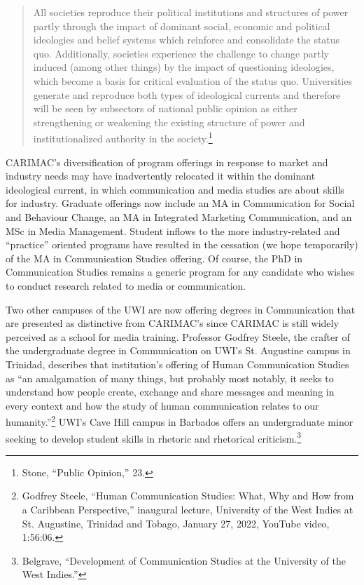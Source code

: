 \documentclass{tufte-handout}
\begin{document}
\begin{quote}
All societies reproduce their political institutions and structures of
power partly through the impact of dominant social, economic and
political ideologies and belief systems which reinforce and consolidate
the status quo. Additionally, societies experience the challenge to
change partly induced (among other things) by the impact of questioning
ideologies, which become a basis for critical evaluation of the status
quo. Universities generate and reproduce both types of ideological
currents and therefore will be seen by subsectors of national public
opinion as either strengthening or weakening the existing structure of
power and institutionalized authority in the society.\footnote{Stone,
  ``Public Opinion,'' 23.}
\end{quote}

\noindent CARIMAC's diversification of program offerings in response to market and
industry needs may have inadvertently relocated it within the dominant
ideological current, in which communication and media studies are about
skills for industry. Graduate offerings now include an MA in
Communication for Social and Behaviour Change, an MA in Integrated
Marketing Communication, and an MSc in Media Management. Student inflows
to the more industry-related and ``practice'' oriented programs have
resulted in the cessation (we hope temporarily) of the MA in
Communication Studies offering. Of course, the PhD in Communication
Studies remains a generic program for any candidate who wishes to
conduct research related to media or communication.

Two other campuses of the UWI are now offering degrees in Communication
that are presented as distinctive from CARIMAC's since CARIMAC is still
widely perceived as a school for media training. Professor Godfrey
Steele, the crafter of the undergraduate degree in Communication on
UWI's St. Augustine campus in Trinidad, describes that institution's
offering of Human Communication Studies as ``an amalgamation of many
things, but probably most notably, it seeks to understand how people
create, exchange and share messages and meaning in every context and how
the study of human communication relates to our humanity.''\footnote{Godfrey
  Steele, ``Human Communication Studies: What, Why and How from a
  Caribbean Perspective,'' inaugural lecture, University of the West
  Indies at St. Augustine, Trinidad and Tobago, January 27, 2022,
  YouTube video, 1:56:06.} UWI's Cave Hill campus in Barbados offers an
undergraduate minor seeking to develop student skills in rhetoric and
rhetorical criticism.\footnote{Belgrave, ``Development of Communication
  Studies at the University of the West Indies.''}
\end{document}
